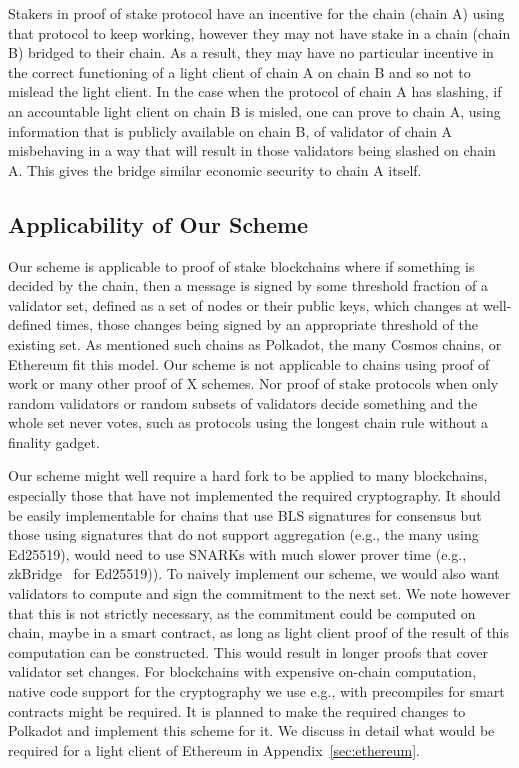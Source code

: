 \noindent Stakers in proof of stake protocol have an incentive for the chain (chain A) using that protocol to keep working, however they may not have stake in a chain (chain B) bridged to their chain. As a result, they may have no particular incentive in the correct functioning of a light client of chain A on chain B and so not to mislead the light client. In the case when the protocol of chain A has slashing, if an accountable light client on chain B is misled, one can prove to chain A, using information that is publicly available on chain B, of validator of chain A misbehaving in a way that will result in those validators being slashed on chain A. This gives the bridge similar economic security to chain A itself.

\vspace{-0.08in}
\subsection{Applicability of Our Scheme}

\noindent Our scheme is applicable to proof of stake blockchains where if something is decided by the chain, then a message is signed by some threshold fraction of a validator set, defined as a set of nodes or their public keys, which changes at well-defined times, those changes being signed by an appropriate threshold of the existing set. As mentioned such chains as Polkadot, the many Cosmos chains, or Ethereum fit this model. Our scheme is not applicable to chains using proof of work or many other proof of X schemes. Nor proof of stake protocols when only random validators or random subsets of validators decide something and the whole set never votes, such as protocols using the longest chain rule without a finality gadget.

\noindent Our scheme might well require a hard fork to be applied to many blockchains, especially those that have not implemented the required cryptography. It should be easily implementable for chains that use BLS signatures for consensus but those using signatures that do not support aggregation (e.g., the many using Ed25519), would need to use SNARKs with much slower prover time (e.g., zkBridge~\cite{zkBridge} for Ed25519)). To naively implement our scheme, we would also want validators to compute and sign the commitment to the next set. We note however that this is not strictly necessary, as the commitment could be computed on chain, maybe in a smart contract, as long as light client proof of the result of this computation can be constructed. This would result in longer proofs that cover validator set changes. For blockchains with expensive on-chain computation, native code support for the cryptography we use e.g., with precompiles for smart contracts might be required. It is planned to make the required changes to Polkadot and implement this scheme for it. We discuss in detail what would be required for a light client of Ethereum in Appendix~\ref{sec:ethereum}.
\vspace{-0.1in}
